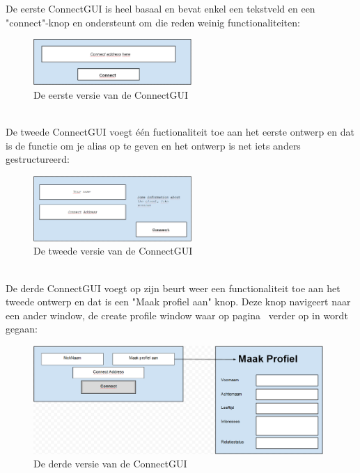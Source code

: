 \documentclass[12pt]{article}
\begin{document}
\noindent De eerste ConnectGUI is heel basaal en bevat enkel een tekstveld en een "connect"-knop en ondersteunt om die reden weinig functionaliteiten:
\begin{figure}[ht]
\begin{center}
\includegraphics[width = 60mm]{CGDv1}
\caption{De eerste versie van de ConnectGUI}
\label{figure004}
\end{center}
\end{figure}
\\

\noindent De tweede ConnectGUI voegt \'e\'en fuctionaliteit toe aan het eerste ontwerp en dat is de functie om je alias op te geven en het ontwerp is net iets anders gestructureerd:
\begin{figure}[ht]
\begin{center}
\includegraphics[width = 60mm]{CGDv2}
\caption{De tweede versie van de ConnectGUI}
\label{figure005}
\end{center}
\end{figure}
\\

\noindent De derde ConnectGUI voegt op zijn beurt weer een functionaliteit toe aan het tweede ontwerp en dat is een "Maak profiel aan" knop. Deze knop navigeert naar een ander window, de create profile window waar op pagina~\pageref{CPW} verder op in wordt gegaan:
\begin{figure}[ht]
\begin{center}
\includegraphics[width = 110mm]{CGDv3}
\caption{De derde versie van de ConnectGUI}
\label{figure006}
\end{center}
\end{figure}
\end{document}
